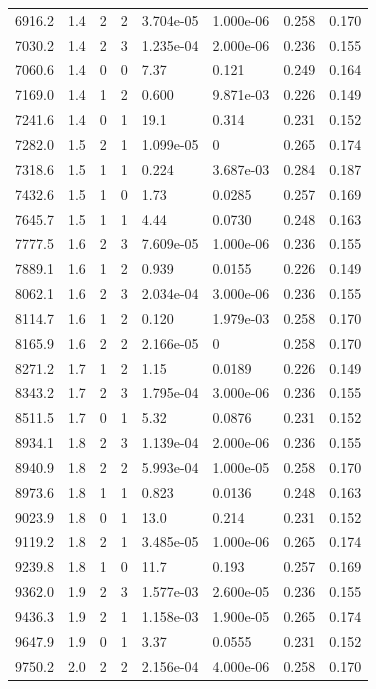 \documentclass[preview]{standalone}
\begin{document}
{{{\begin{tabular}{L{1.2cm}C{1.2cm} C{0.3cm}C{0.5cm} C{1.4cm}C{1.4cm} C{1.4cm}C{1.4cm}}
  6916.2  &   1.4  & 2     &  2 &  3.704e-05  & 1.000e-06  & 0.258 &  0.170   \\ 
  7030.2  &   1.4  & 2     &  3 &  1.235e-04  & 2.000e-06  & 0.236 &  0.155   \\ 
  7060.6  &   1.4  & 0     &  0 &  7.37  & 0.121  & 0.249 &  0.164   \\ 
  7169.0  &   1.4  & 1     &  2 &  0.600  & 9.871e-03  & 0.226 &  0.149   \\ 
  7241.6  &   1.4  & 0     &  1 &  19.1  & 0.314  & 0.231 &  0.152   \\ 
  7282.0  &   1.5  & 2     &  1 &  1.099e-05  & 0  & 0.265 &  0.174   \\ 
  7318.6  &   1.5  & 1     &  1 &  0.224  & 3.687e-03  & 0.284 &  0.187   \\ 
  7432.6  &   1.5  & 1     &  0 &  1.73  & 0.0285  & 0.257 &  0.169   \\ 
  7645.7  &   1.5  & 1     &  1 &  4.44  & 0.0730  & 0.248 &  0.163   \\ 
  7777.5  &   1.6  & 2     &  3 &  7.609e-05  & 1.000e-06  & 0.236 &  0.155   \\ 
  7889.1  &   1.6  & 1     &  2 &  0.939  & 0.0155  & 0.226 &  0.149   \\ 
  8062.1  &   1.6  & 2     &  3 &  2.034e-04  & 3.000e-06  & 0.236 &  0.155   \\ 
  8114.7  &   1.6  & 1     &  2 &  0.120  & 1.979e-03  & 0.258 &  0.170   \\ 
  8165.9  &   1.6  & 2     &  2 &  2.166e-05  & 0  & 0.258 &  0.170   \\ 
  8271.2  &   1.7  & 1     &  2 &  1.15  & 0.0189  & 0.226 &  0.149   \\ 
  8343.2  &   1.7  & 2     &  3 &  1.795e-04  & 3.000e-06  & 0.236 &  0.155   \\ 
  8511.5  &   1.7  & 0     &  1 &  5.32  & 0.0876  & 0.231 &  0.152   \\ 
  8934.1  &   1.8  & 2     &  3 &  1.139e-04  & 2.000e-06  & 0.236 &  0.155   \\ 
  8940.9  &   1.8  & 2     &  2 &  5.993e-04  & 1.000e-05  & 0.258 &  0.170   \\ 
  8973.6  &   1.8  & 1     &  1 &  0.823  & 0.0136  & 0.248 &  0.163   \\ 
  9023.9  &   1.8  & 0     &  1 &  13.0  & 0.214  & 0.231 &  0.152   \\ 
  9119.2  &   1.8  & 2     &  1 &  3.485e-05  & 1.000e-06  & 0.265 &  0.174   \\ 
  9239.8  &   1.8  & 1     &  0 &  11.7  & 0.193  & 0.257 &  0.169   \\ 
  9362.0  &   1.9  & 2     &  3 &  1.577e-03  & 2.600e-05  & 0.236 &  0.155   \\ 
  9436.3  &   1.9  & 2     &  1 &  1.158e-03  & 1.900e-05  & 0.265 &  0.174   \\ 
  9647.9  &   1.9  & 0     &  1 &  3.37  & 0.0555  & 0.231 &  0.152   \\ 
  9750.2  &   2.0  & 2     &  2 &  2.156e-04  & 4.000e-06  & 0.258 &  0.170   \\ 
\hline 
\end{tabular} 

}}}
\end{document}

